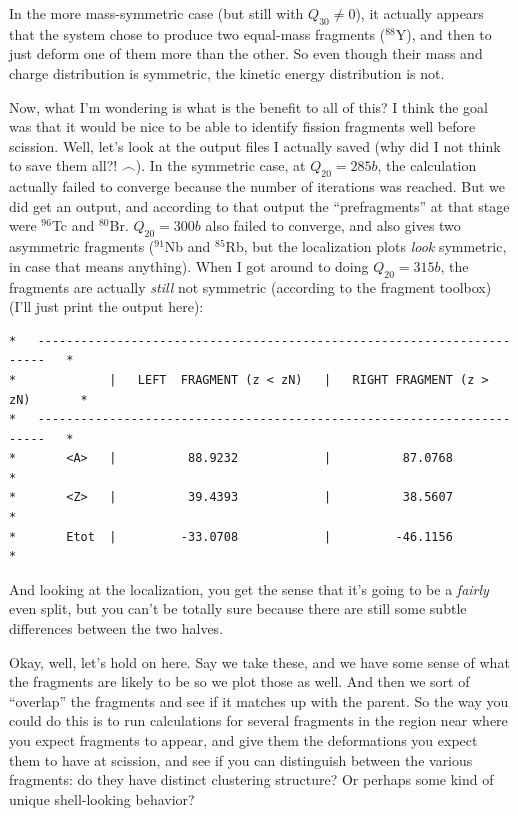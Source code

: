 In the more mass-symmetric case (but still with $Q_{30}\neq0$), it actually appears that the system chose to produce two equal-mass fragments ($^{88}$Y), and then to just deform one of them more than the other. So even though their mass and charge distribution is symmetric, the kinetic energy distribution is not.

Now, what I'm wondering is what is the benefit to all of this? I think the goal was that it would be nice to be able to identify fission fragments well before scission. Well, let's look at the output files I actually saved (why did I not think to save them all?! $\frown$). In the symmetric case, at $Q_{20}=285b$, the calculation actually failed to converge because the number of iterations was reached. But we did get an output, and according to that output the ``prefragments'' at that stage were $^{96}$Tc and $^{80}$Br. $Q_{20}=300b$ also failed to converge, and also gives two asymmetric fragments ($^{91}$Nb and $^{85}$Rb, but the localization plots \textit{look} symmetric, in case that means anything). When I got around to doing $Q_{20}=315b$, the fragments are actually \textit{still} not symmetric (according to the fragment toolbox) (I'll just print the output here):
\begin{verbatim}
*   -----------------------------------------------------------------------   *
*             |   LEFT  FRAGMENT (z < zN)   |   RIGHT FRAGMENT (z > zN)       *
*   -----------------------------------------------------------------------   *
*       <A>   |          88.9232            |          87.0768                *
*       <Z>   |          39.4393            |          38.5607                *
*       Etot  |         -33.0708            |         -46.1156                *
\end{verbatim}

\noindent And looking at the localization, you get the sense that it's going to be a \textit{fairly} even split, but you can't be totally sure because there are still some subtle differences between the two halves.

Okay, well, let's hold on here. Say we take these, and we have some sense of what the fragments are likely to be so we plot those as well. And then we sort of ``overlap'' the fragments and see if it matches up with the parent. So the way you could do this is to run calculations for several fragments in the region near where you expect fragments to appear, and give them the deformations you expect them to have at scission, and see if you can distinguish between the various fragments: do they have distinct clustering structure? Or perhaps some kind of unique shell-looking behavior?

